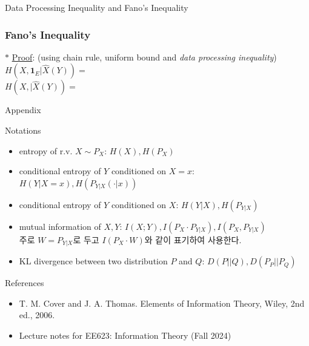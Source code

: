 \documentclass[9pt]{beamer}
\begin{document}
\begin{section}{Data Processing Inequality and Fano's Inequality}
        \begin{frame}
            \frametitle{Fano's Inequality}
            $\ast$ \underline{Proof}: (using chain rule, uniform bound and \textit{data processing inequality})
            $$H(X, \textbf{1}_E|\hat X(Y)) = \qquad \qquad \qquad \qquad \qquad \qquad \qquad \qquad \qquad \qquad \qquad \qquad \qquad \qquad \qquad \qquad$$
            \vspace{1cm}
            $$H(X, | \hat X(Y)) = \qquad \qquad \qquad \qquad \qquad \qquad \qquad \qquad \qquad \qquad \qquad \qquad \qquad \qquad \qquad \qquad$$
            \vspace{3cm}
        \end{frame}
    \end{section}

    \begin{frame}{Appendix}
        \begin{block}{Notations}
            \begin{itemize}
                \item entropy of r.v. $X \sim P_X$: $H(X), H(P_X)$
                \item conditional entropy of $Y$ conditioned on $X=x$: $H(Y|X=x) , H(P_{Y|X}(\cdot|x))$
                \item conditional entropy of $Y$ conditioned on $X$: $H(Y|X) , H(P_{Y|X})$
                \item mutual information of $X, Y$: $I(X;Y), I(P_X \cdot P_{Y|X}), I(P_X , P_{Y|X})$ \\
                주로 $W= P_{Y|X}$로 두고 $I(P_X \cdot W)$와 같이 표기하여 사용한다.
                \item KL divergence between two distribution $P$ and $Q$: $D(P||Q),  D(P_P||P_Q)$
            \end{itemize}
        \end{block}
    \end{frame}

    \begin{frame}{References}
        \begin{itemize}
            \item T. M. Cover and J. A. Thomas. Elements of Information Theory, Wiley, 2nd ed., 2006.
            \item Lecture notes for EE623: Information Theory (Fall 2024)
        \end{itemize}
        \vspace{6cm}
    \end{frame}
\end{document}
